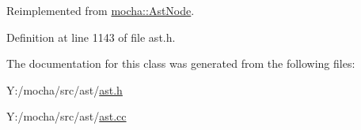 Reimplemented from \hyperlink{classmocha_1_1_ast_node_a876b49852a3151d977c842a90ee02771}{mocha::AstNode}.



Definition at line 1143 of file ast.h.



The documentation for this class was generated from the following files:\begin{DoxyCompactItemize}
\item 
Y:/mocha/src/ast/\hyperlink{ast_8h}{ast.h}\item 
Y:/mocha/src/ast/\hyperlink{ast_8cc}{ast.cc}\end{DoxyCompactItemize}
